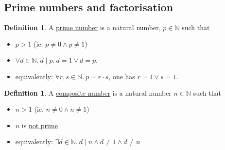 \documentclass[12pt]{article}
\newcounter{dummy} \numberwithin{dummy}{section}
\numberwithin{equation}{dummy}
\theoremstyle{definition}
\newtheorem{defn}[dummy]{Definition}
\newcommand{\nat}{\mathbb{N}}
\begin{document}
\newpage
\subsection*{Prime numbers and factorisation}
\begin{defn}
    A \underline{prime number} is a natural number, $p\in \nat$ such that
    \begin{itemize}
        \item $p > 1$ (ie. $p\ne 0 \land p \ne 1$)
        \item $\forall d \in \nat .~ d\mid p.~ d=1 \lor d=p$.
        \item[] equivalently: $\forall r,s \in\nat.~ p=r\cdot s$, one has $r=1\lor s=1$.
    \end{itemize}
\end{defn}
\begin{defn}
    A \underline{composite number} is a natural number $n\in\nat$ such that
    \begin{itemize}
        \item $n > 1$ (ie. $n\ne 0 \land n \ne 1$)
        \item $n$ is \underline{not prime}
        \item[] equivalently: $\exists d \in \nat.~ d\mid n \land d\ne 1 \land d\ne n$
    \end{itemize}
\end{defn}
\end{document}
